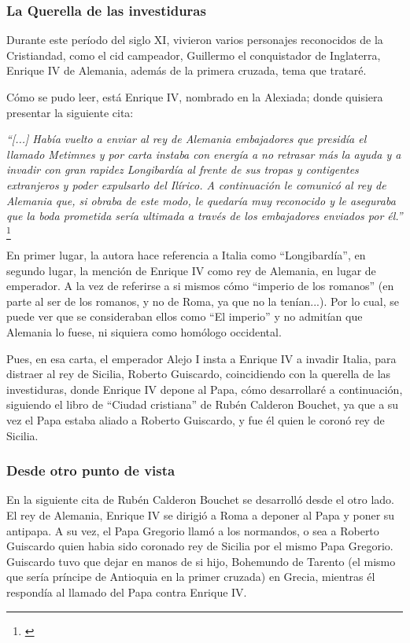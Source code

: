 

\subsubsection{La Querella de las investiduras}

Durante este período del siglo XI, vivieron varios personajes
reconocidos de la Cristiandad, como el cid campeador, Guillermo
el conquistador de Inglaterra, Enrique IV de Alemania, además
de la primera cruzada, tema que trataré.

Cómo se pudo leer, está Enrique IV, nombrado en la Alexiada;
donde quisiera presentar la siguiente cita:

\textit{``[...] Había vuelto a enviar al rey de Alemania embajadores
que presidía el llamado Metimnes y por carta instaba con energía a no
retrasar más la ayuda y a invadir con gran rapidez Longibardía al frente
de sus tropas y contigentes extranjeros y poder expulsarlo del Ilírico.
A continuación le comunicó al rey de Alemania que, si obraba de este
modo, le quedaría muy reconocido y le aseguraba que la boda prometida
sería ultimada a través de los embajadores enviados por él.''}
\footnote{\cite[p.~215]{alexiadaV}}

En primer lugar, la autora hace referencia a Italia como ``Longibardía'',
en segundo lugar, la mención de Enrique IV como rey de Alemania, en
lugar de emperador. A la vez de referirse a si mismos cómo
``imperio de los romanos'' (en parte al ser de los romanos, y no
de Roma, ya que no la tenían...). Por lo cual, se puede ver
que se consideraban ellos como ``El imperio'' y no admitían que
Alemania lo fuese, ni siquiera como homólogo occidental.

Pues, en esa carta, el emperador Alejo I insta a Enrique IV a invadir
Italia, para distraer al rey de Sicilia, Roberto Guiscardo,
coincidiendo con la querella de las investiduras, donde Enrique IV
depone al Papa, cómo desarrollaré a continuación, siguiendo el libro de
``Ciudad cristiana'' de Rubén Calderon Bouchet, ya que a su vez
el Papa estaba aliado a Roberto Guiscardo, y fue él quien le coronó
rey de Sicilia.

\subsubsection{Desde otro punto de vista}


En la siguiente cita de Rubén Calderon Bouchet se desarrolló
desde el otro lado. El rey de Alemania, Enrique IV
se dirigió a Roma a deponer al Papa y poner su antipapa.
A su vez, el Papa Gregorio llamó a los normandos,
o sea a Roberto Guiscardo quien habia sido coronado rey de Sicilia
por el mismo Papa Gregorio.
Guiscardo tuvo que dejar en manos de si hijo, Bohemundo de Tarento
(el mismo que sería príncipe de Antioquia en la primer cruzada)
en Grecia, mientras él respondía al llamado del Papa
contra Enrique IV.

